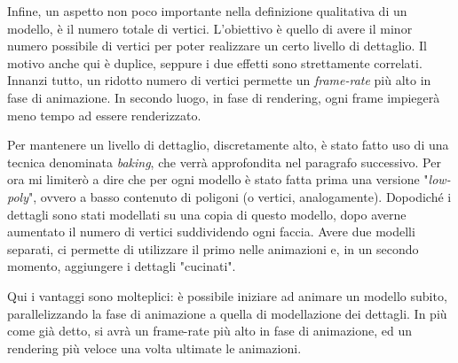 Infine, un aspetto non poco importante nella definizione qualitativa di un modello, è il numero totale di vertici.
L'obiettivo è quello di avere il minor numero possibile di vertici per poter realizzare un certo livello di dettaglio.
Il motivo anche qui è duplice, seppure i due effetti sono strettamente correlati.
Innanzi tutto, un ridotto numero di vertici permette un \emph{frame-rate} più alto in fase di animazione.
In secondo luogo, in fase di rendering, ogni frame impiegerà meno tempo ad essere renderizzato.

Per mantenere un livello di dettaglio, discretamente alto, è stato fatto uso di una tecnica denominata \emph{baking}, che verrà approfondita nel paragrafo successivo.
Per ora mi limiterò a dire che per ogni modello è stato fatta prima una versione "\emph{low-poly}", ovvero a basso contenuto di poligoni (o vertici, analogamente).
Dopodiché i dettagli sono stati modellati su una copia di questo modello, dopo averne aumentato il numero di vertici suddividendo ogni faccia.
Avere due modelli separati, ci permette di utilizzare il primo nelle animazioni e, in un secondo momento, aggiungere i dettagli "cucinati".

Qui i vantaggi sono molteplici: è possibile iniziare ad animare un modello subito, parallelizzando la fase di animazione a quella di modellazione dei dettagli.
In più come già detto, si avrà un frame-rate più alto in fase di animazione, ed un rendering più veloce una volta ultimate le animazioni.

